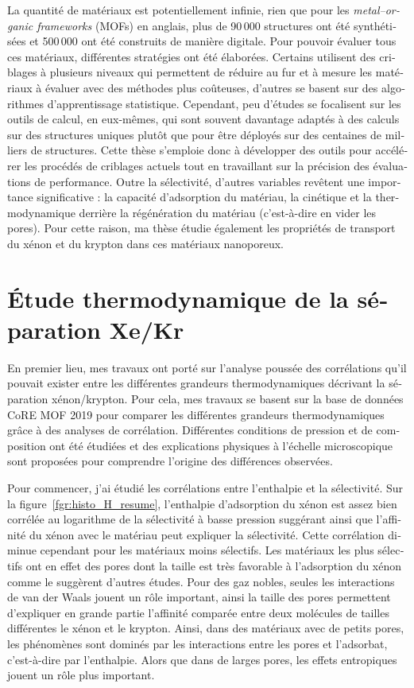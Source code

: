 \documentclass[thesis]{subfiles}
\begin{document}
\begin{otherlanguage}{french}
La quantité de matériaux est potentiellement infinie, rien que pour les \emph{metal--organic frameworks} (MOFs) en anglais, plus de 90\,000 structures ont été synthétisées et 500\,000 ont été construits de manière digitale. Pour pouvoir évaluer tous ces matériaux, différentes stratégies ont été élaborées. Certains utilisent des criblages à plusieurs niveaux qui permettent de réduire au fur et à mesure les matériaux à évaluer avec des méthodes plus coûteuses, d'autres se basent sur des algorithmes d'apprentissage statistique. Cependant, peu d'études se focalisent sur les outils de calcul, en eux-mêmes, qui sont souvent davantage adaptés à des calculs sur des structures uniques plutôt que pour être déployés sur des centaines de milliers de structures. Cette thèse s'emploie donc à développer des outils pour accélérer les procédés de criblages actuels tout en travaillant sur la précision des évaluations de performance. Outre la sélectivité, d'autres variables revêtent une importance significative : la capacité d'adsorption du matériau, la cinétique et la thermodynamique derrière la régénération du matériau (c'est-à-dire en vider les pores). Pour cette raison, ma thèse étudie également les propriétés de transport du xénon et du krypton dans ces matériaux nanoporeux. 

\section*{\'Etude thermodynamique de la séparation Xe/Kr}

En premier lieu, mes travaux ont porté sur l'analyse poussée des corrélations qu'il pouvait exister entre les différentes grandeurs thermodynamiques décrivant la séparation xénon/krypton. Pour cela, mes travaux se basent sur la base de données CoRE MOF 2019 pour comparer les différentes grandeurs thermodynamiques grâce à des analyses de corrélation. Différentes conditions de pression et de composition ont été étudiées et des explications physiques à l'échelle microscopique sont proposées pour comprendre l'origine des différences observées. 

Pour commencer, j'ai étudié les corrélations entre l'enthalpie et la sélectivité. Sur la figure~\ref{fgr:histo_H_resume}, l'enthalpie d'adsorption du xénon est assez bien corrélée au logarithme de la sélectivité à basse pression suggérant ainsi que l'affinité du xénon avec le matériau peut expliquer la sélectivité. Cette corrélation diminue cependant pour les matériaux moins sélectifs. Les matériaux les plus sélectifs ont en effet des pores dont la taille est très favorable à l'adsorption du xénon comme le suggèrent d'autres études. Pour des gaz nobles, seules les interactions de van der Waals jouent un rôle important, ainsi la taille des pores permettent d'expliquer en grande partie l'affinité comparée entre deux molécules de tailles différentes le xénon et le krypton. Ainsi, dans des matériaux avec de petits pores, les phénomènes sont dominés par les interactions entre les pores et l'adsorbat, c'est-à-dire par l'enthalpie. Alors que dans de larges pores, les effets entropiques jouent un rôle plus important.


\end{otherlanguage}
\end{document}
